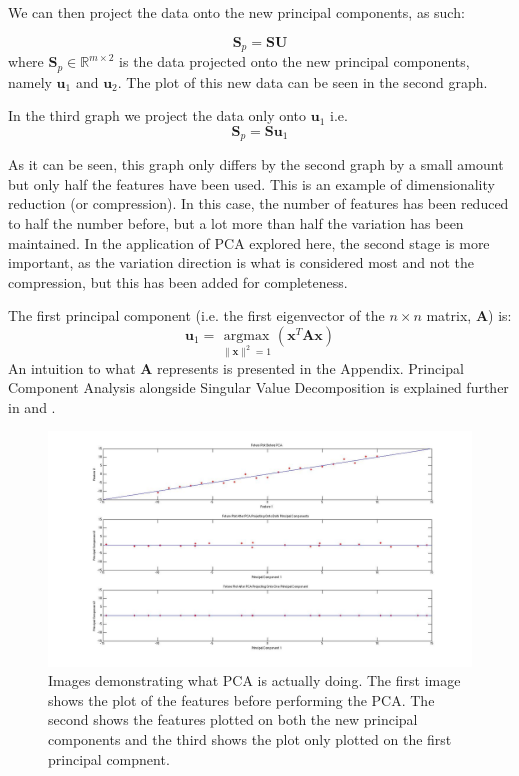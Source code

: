 \documentclass[11pt,a4paper]{article}
\begin{document}
We can then project the data onto the new principal components, as such:

\begin{equation*}
\mathbf{S}_p = \mathbf{S}\mathbf{U}
\end{equation*}
where $\mathbf{S}_p \in \mathbb{R}^{m \times 2}$ is the data projected onto the new principal components, namely $\mathbf{u}_1$ and $\mathbf{u}_2$. The plot of this new data can be seen in the second graph. 

In the third graph we project the data only onto $\mathbf{u}_1$ i.e.
\begin{equation*}
\mathbf{S}_p = \mathbf{S}\mathbf{u}_1
\end{equation*}

As it can be seen, this graph only differs by the second graph by a small amount but only half the features have been used. This is an example of dimensionality reduction (or compression). In this case, the number of features has been reduced to half the number before, but a lot more than half the variation has been maintained. In the application of PCA explored here, the second stage is more important, as the variation direction is what is considered most and not the compression, but this has been added for completeness.

The first principal component (i.e. the first eigenvector of the $n\times n$ matrix, $\mathbf{A}$) is:
\begin{equation}
\mathbf{u}_1 = \underset{\|\mathbf{x}\|^2 = 1}{\operatorname{argmax}}\left( \mathbf{x}^T\mathbf{A}\mathbf{x}\right)
\end{equation}
An intuition to what $\mathbf{A}$ represents is presented in the Appendix. Principal Component Analysis alongside Singular Value Decomposition is explained further in \cite{datascience} and \cite{bishop}. 

\begin{figure}[H]
\centering
\includegraphics[scale=0.35]{PCA_EXPLAINED.jpg}
\caption{Images demonstrating what PCA is actually doing. The first image shows the plot of the features before performing the PCA. The second shows the features plotted on both the new principal components and the third shows the plot only plotted on the first principal compnent.}
\label{pca}
\end{figure}
\end{document}
